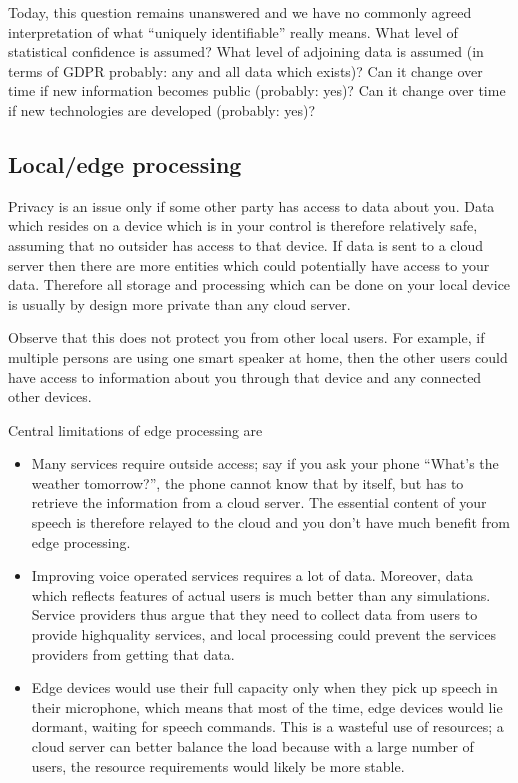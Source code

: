 \documentclass[letterpaper,10pt,english]{jupyterBook}
\begin{document}
\sphinxAtStartPar
Today, this question remains unanswered and we have no commonly agreed
interpretation of what “uniquely identifiable” really means. What level
of statistical confidence is assumed? What level of adjoining data is
assumed (in terms of GDPR probably: any and all data which exists)? Can
it change over time if new information becomes public (probably: yes)?
Can it change over time if new technologies are developed (probably:
yes)?


\subsection{Local/edge processing}
\label{\detokenize{Security_and_privacy:local-edge-processing}}
\sphinxAtStartPar
Privacy is an issue only if some other party has access to data about
you. Data which resides on a device which is in your control is
therefore relatively safe, assuming that no outsider has access to that
device. If data is sent to a cloud server then there are more entities
which could potentially have access to your data. Therefore all storage
and processing which can be done on your local device is usually by
design more private than any cloud server.

\sphinxAtStartPar
Observe that this does not protect you from other local users. For
example, if multiple persons are using one smart speaker at home, then
the other users could have access to information about you through that
device and any connected other devices.

\sphinxAtStartPar
Central limitations of edge processing are
\begin{itemize}
\item {} 
\sphinxAtStartPar
Many services require outside access; say if you ask your phone
“What’s the weather tomorrow?”, the phone cannot know that by
itself, but has to retrieve the information from a cloud server. The
essential content of your speech is therefore relayed to the cloud
and you don’t have much benefit from edge processing.

\item {} 
\sphinxAtStartPar
Improving voice operated services requires a lot of data. Moreover,
data which reflects features of actual users is much better than any
simulations. Service providers thus argue that they need to collect
data from users to provide high\sphinxhyphen{}quality services, and local
processing could prevent the services providers from getting that
data.

\item {} 
\sphinxAtStartPar
Edge devices would use their full capacity only when they pick up
speech in their microphone, which means that most of the time, edge
devices would lie dormant, waiting for speech commands. This is a
wasteful use of resources; a cloud server can better balance the
load because with a large number of users, the resource requirements
would likely be more stable.

\end{itemize}
\end{document}
